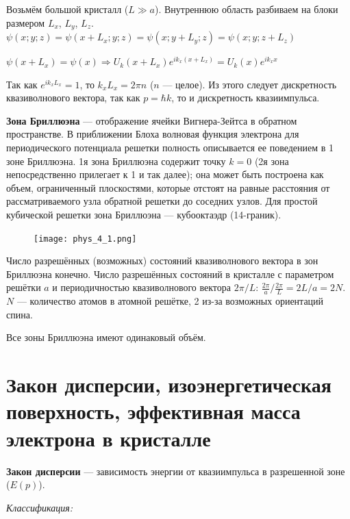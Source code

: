 Возьмём большой кристалл ($L \gg a$). Внутреннюю область разбиваем на блоки размером $L_x$, $L_y$, $L_z$.
$\psi(x; y; z) = \psi(x +L_x; y; z) = \psi(x; y+L_y; z) = \psi(x; y; z+L_z)$

$\psi(x+L_x)=\psi(x) \Rightarrow U_{k}(x+L_x)e^{ik_{x} (x+L_x)}=U_k(x)e^{ik_{x} x}$

Так как $e^{ik_{x} L_x}=1$, то $k_x L_x=2 \pi n$ ($n$ --- целое). Из этого следует дискретность квазиволнового вектора, так как $p=\hbar k$, то и дискретность квазиимпульса.

\textbf{Зона Бриллюэна} --- отображение ячейки Вигнера-Зейтса в обратном пространстве. В приближении Блоха волновая функция электрона для периодического потенциала решетки полность описывается ее поведением в 1 зоне Бриллюэна. 1я зона Бриллюэна содержит точку $k=0$ (2я зона непосредственно прилегает к 1 и так далее); она может быть построена как объем, ограниченный плоскостями, которые отстоят на равные расстояния от рассматриваемого узла обратной решетки до соседних узлов. Для простой кубической решетки зона Бриллюэна --- кубооктаэдр (14-граник).

\begin{figure}[h!]
    \centering
    \texttt{[image: phys\_4\_1.png]}
\end{figure}

Число разрешённых (возможных) состояний квазиволнового вектора в зон Бриллюэна конечно. Число разрешённых состояний в кристалле с параметром решётки $a$ и периодичностью квазиволнового вектора $2\pi /L$: $\frac{2\pi}{a} / \frac{2\pi}{L} = 2 L/a = 2N$. $N$ --- количество атомов в атомной решётке, 2 из-за возможных ориентаций спина.

Все зоны Бриллюэна имеют одинаковый объём.



\section{Закон дисперсии, изоэнергетическая поверхность, эффективная масса электрона в кристалле}

\textbf{Закон дисперсии} --- зависимость энергии от квазиимпульса в разрешенной зоне ($E(p)$).

\textit{Классификация:}

